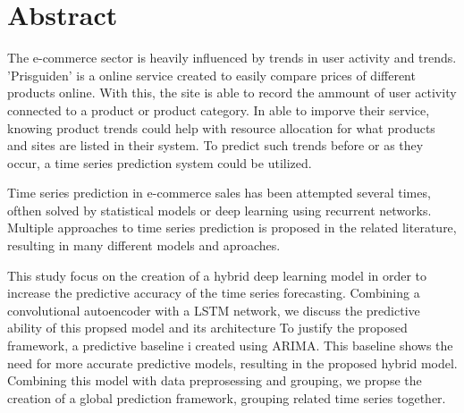 \section*{Abstract}
\label{section:Abstract}

The e-commerce sector is heavily influenced by trends in user activity and trends.
'Prisguiden' is a online service created to easily compare prices of different products online.
With this, the site is able to record the ammount of user activity connected to a product or product category.
In able to imporve their service, knowing product trends could help with resource allocation for what products and sites are listed in their system.
To predict such trends before or as they occur, a time series prediction system could be utilized.

Time series prediction in e-commerce sales has been attempted several times,
ofthen solved by statistical models or deep learning using recurrent networks.
Multiple approaches to time series prediction is proposed in the related literature,
resulting in many different models and aproaches.

This study focus on the creation of a hybrid deep learning model in order to increase the predictive accuracy
of the time series forecasting.
Combining a convolutional autoencoder with a LSTM network, we discuss the predictive ability of this propsed model
and its architecture
To justify the proposed framework, a predictive baseline i created using ARIMA.
This baseline shows the need for more accurate predictive models,
resulting in the proposed hybrid model.
Combining this model with data preprosessing and grouping, we propse the creation of a global prediction framework,
grouping related time series together.




\iffalse
This paper provides a template for writing AI project rapports for either the AI specialization project; masters "datateknikk" or masters "informatikk". The use of the template is recommended and is written in english as we encourage students to submit their project and masters theses in English.
The template does not form a compulsory style that you are obliged to use. However, the format and contents are a result of a joint AI group initiative thus providing a common starting point for all AI students. For a given project tuning of the template may still be required. Such tuning might involve moving a chapter to a section or vice versa due to the nature of the project.

The abstract is your sales pitch which encourages people to read your work but unlike sales it should be realistic with respect to the contributions of the work. It should include:
\begin{itemize}
    \item the field of research
    \item a brief motivation for the work
    \item what the research topic is and
    \item the research approach(es) applied.
    \item contributions
\end{itemize}

The abstract length should be roughly half a page of text --- without lists, tables or figures.
\fi
